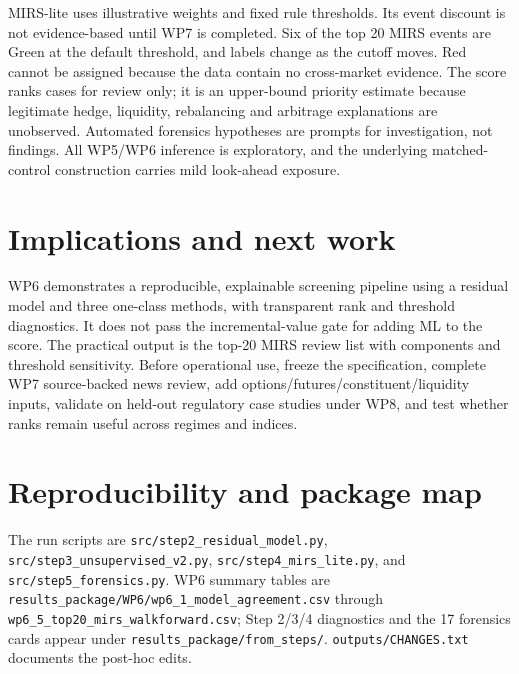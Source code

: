 \documentclass[11pt,a4paper]{article}
\begin{document}
MIRS-lite uses illustrative weights and fixed rule thresholds. Its event discount is not evidence-based until WP7 is completed. Six of the top 20 MIRS events are Green at the default threshold, and labels change as the cutoff moves. Red cannot be assigned because the data contain no cross-market evidence. The score ranks cases for review only; it is an upper-bound priority estimate because legitimate hedge, liquidity, rebalancing and arbitrage explanations are unobserved. Automated forensics hypotheses are prompts for investigation, not findings. All WP5/WP6 inference is exploratory, and the underlying matched-control construction carries mild look-ahead exposure.

\section{Implications and next work}
WP6 demonstrates a reproducible, explainable screening pipeline using a residual model and three one-class methods, with transparent rank and threshold diagnostics. It does not pass the incremental-value gate for adding ML to the score. The practical output is the top-20 MIRS review list with components and threshold sensitivity. Before operational use, freeze the specification, complete WP7 source-backed news review, add options/futures/constituent/liquidity inputs, validate on held-out regulatory case studies under WP8, and test whether ranks remain useful across regimes and indices.

\appendix
\section{Reproducibility and package map}
The run scripts are \texttt{src/step2\_residual\_model.py}, \texttt{src/step3\_unsupervised\_v2.py}, \texttt{src/step4\_mirs\_lite.py}, and \texttt{src/step5\_forensics.py}. WP6 summary tables are \texttt{results\_package/WP6/wp6\_1\_model\_agreement.csv} through \texttt{wp6\_5\_top20\_mirs\_walkforward.csv}; Step 2/3/4 diagnostics and the 17 forensics cards appear under \texttt{results\_package/from\_steps/}. \texttt{outputs/CHANGES.txt} documents the post-hoc edits.
\end{document}
